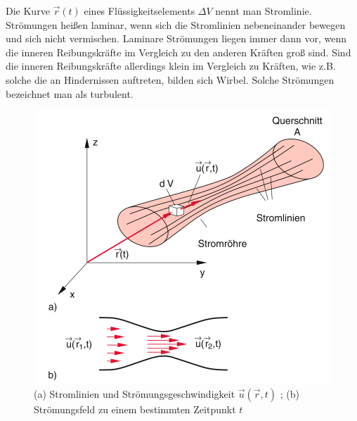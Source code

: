 Die Kurve $ \vec{r} (t) $ eines Flüssigkeitselements $ \Delta V $ nennt man Stromlinie. Strömungen heißen laminar, wenn sich die Stromlinien nebeneinander bewegen und sich nicht vermischen. Laminare Strömungen liegen immer dann vor, wenn die inneren Reibungskräfte im Vergleich zu den anderen Kräften groß sind. Sind die inneren Reibungskräfte allerdings klein im Vergleich zu Kräften, wie z.B. solche die an Hindernissen auftreten, bilden sich Wirbel. Solche Strömungen bezeichnet man als turbulent.

\begin{figure}
        \includegraphics[width=.9\textwidth]{images/8-1}
\caption{(a) Stromlinien und Strömungsgeschwindigkeit $ \vec{u}(\vec{r},t) $ ; (b) Strömungsfeld zu einem bestimmten Zeitpunkt $t$ }
\label{fig:8-1}
\end{figure}

